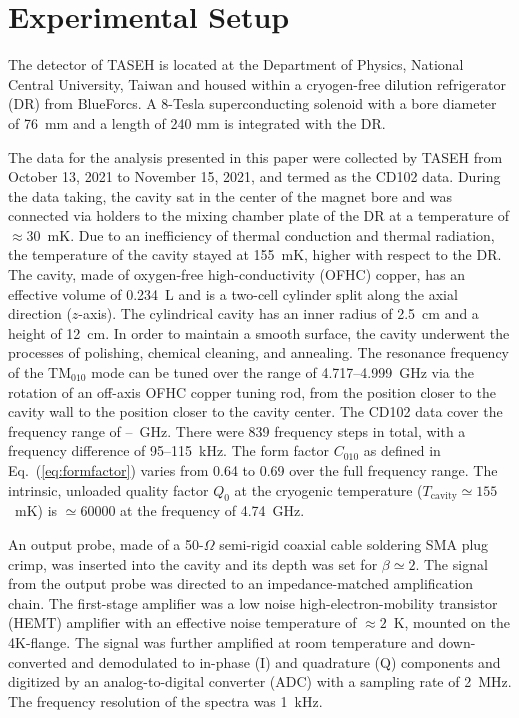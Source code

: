 
\section{Experimental Setup}\label{sec:taseh} 
The detector of TASEH is located at the Department of Physics, National 
Central University, Taiwan and housed within a cryogen-free dilution 
refrigerator (DR) from BlueForcs. A 8-Tesla superconducting solenoid with a 
bore diameter of 76~mm and a length of 240 mm is integrated with the DR. 

The data for the analysis presented in this paper were collected by TASEH 
from October 13, 2021 to November 15, 2021, and termed as the CD102 data. 
During the data taking, the cavity sat in the center of the magnet bore 
and was connected via holders 
to the mixing chamber plate of the DR at a temperature of $\approx$30~mK. 
Due to an inefficiency of thermal conduction and thermal radiation, 
the temperature of the cavity stayed at 155~mK, higher with respect to the DR.
The cavity, made of oxygen-free high-conductivity (OFHC) copper, has an 
effective volume of 0.234~L and is a two-cell cylinder split along 
the axial direction ($z$-axis). 
The cylindrical cavity has an inner radius of 2.5~cm and a 
height of 12~cm.  In order to maintain a smooth surface, the cavity underwent 
the processes of polishing, chemical cleaning, and annealing. The resonance 
frequency of the TM$_{010}$ mode can be tuned over the range of 
4.717--4.999~GHz via the rotation of an off-axis OFHC copper tuning rod, from 
the position closer to the cavity wall to the position closer to the cavity 
center. The CD102 data cover the frequency range of \flo--\fhi~GHz. 
There were 839 frequency steps in total, with a frequency difference of 
95--115~kHz. The form factor $C_{010}$ as defined in Eq.~(\ref{eq:formfactor}) 
varies from 0.64 to 0.69 over the full frequency range.  
The intrinsic, unloaded quality factor $Q_0$ at the cryogenic temperature 
($T_\mathrm{cavity}\simeq 155$~mK) is $\simeq 60000$ at the frequency of 
4.74~GHz.

An output probe, made of a 50-$\Omega$ semi-rigid coaxial cable 
soldering SMA plug crimp, was inserted into the cavity and its depth was set for 
$\beta\simeq2$.  The signal from the output probe was directed to an 
impedance-matched amplification chain. The first-stage amplifier was 
a low noise high-electron-mobility transistor (HEMT) amplifier with an 
effective noise temperature of $\approx 2$~K, mounted on the 4K-flange. 
The signal was further amplified at room temperature and down-converted 
and demodulated to in-phase (I) and quadrature (Q) components and digitized 
by an analog-to-digital converter (ADC) with a sampling rate of 2~MHz. 
The frequency resolution of the spectra was 1~kHz.

